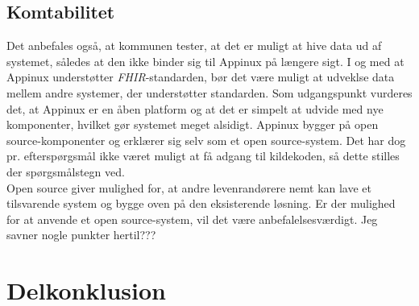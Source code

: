 \subsection{Komtabilitet}
Det anbefales også, at kommunen tester, at det er muligt at hive data ud af systemet, således at den ikke binder sig til Appinux på længere sigt. I og med at Appinux understøtter \textit{FHIR}-standarden, bør det være muligt at udveklse data mellem andre systemer, der understøtter standarden. Som udgangspunkt vurderes det, at Appinux er en åben platform og at det er simpelt at udvide med nye komponenter, hvilket gør systemet meget alsidigt. Appinux bygger på open source-komponenter og erklærer sig selv som et open source-system. Det har dog pr. efterspørgsmål ikke været muligt at få adgang til kildekoden, så dette stilles der spørgsmålstegn ved.\\Open source giver mulighed for, at andre levenrandørere nemt kan lave et tilsvarende system og bygge oven på den eksisterende løsning. Er der mulighed for at anvende et open source-system, vil det være anbefalelsesværdigt.
Jeg savner nogle punkter hertil???
\section{Delkonklusion}

